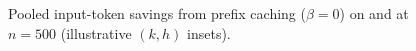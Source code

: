 \begin{figure}[t]
\centering
\par
\caption{Pooled input-token savings from prefix caching ($\beta{=}0$) on \DLtwozero{} and \COVIDshort{} at $n{=}500$ (illustrative $(k,h)$ insets).}
\label{fig:e4a-c2}
\end{figure}
